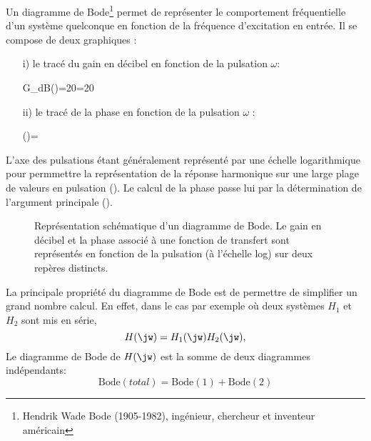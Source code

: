 Un diagramme de Bode\footnote{Hendrik Wade Bode 
(1905-1982), ingénieur, chercheur et inventeur américain} permet de 
représenter le comportement fréquentielle d'un système quelconque en fonction 
de la fréquence  d'excitation en entrée. Il se compose de deux graphiques :
\begin{itemize}
    \item[i)] le tracé du gain en décibel en fonction de la pulsation $\omega$:
        \begin{bequation} 
        G_{dB}(\omega)=20=20 
        \end{bequation}
    \item[ii)] le tracé de la phase en fonction de la pulsation $\omega$ :
        \begin{bequation} 
        \phi(\omega)=
        \end{bequation}
\end{itemize}
L'axe des pulsations étant généralement représenté par une échelle 
logarithmique pour permmettre la représentation de la réponse harmonique sur 
une large plage de valeurs en pulsation (). Le calcul de la
phase passe lui par la détermination de l'argument principale 
().

\begin{figure}[!h]
    \centering
    
    \caption{Représentation schématique d'un diagramme de Bode. Le gain en 
             décibel et la phase associé à une fonction de transfert sont 
             représentés en fonction de la pulsation (à l'échelle log) sur 
             deux repères distincts.\label{fig-sche_bode}}
\end{figure}

La principale propriété du diagramme de Bode est de permettre de 
simplifier un grand nombre calcul. En effet, dans le cas par exemple où 
deux systèmes $H_1$ et $H_2$ sont mis en série,
$$
H(\jw)=H_1(\jw)H_2(\jw),
$$
Le diagramme de Bode de $H(\jw)$ est la somme de deux diagrammes indépendants:
$$
\mathrm{Bode}(total)=\mathrm{Bode}(1)+\mathrm{Bode}(2)
$$
